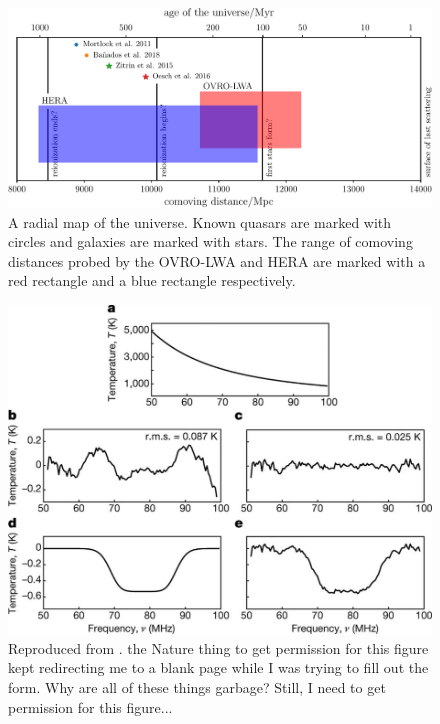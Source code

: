 \begin{bibunit}
\begin{figure}[t]
    \centering
    \includegraphics[width=\textwidth]{figures/chapter1/history-of-the-universe/history-of-the-universe}
    \caption{
        A radial map of the universe. Known quasars are marked with circles and galaxies are marked
        with stars. The range of comoving distances probed by the OVRO-LWA and HERA are marked with a red
        rectangle and a blue rectangle respectively.
    }
    \label{fig:history-of-the-universe}
\end{figure}

\begin{figure}[t]
    \centering
    \includegraphics[width=\textwidth]{figures/chapter1/bowman-2018-absorption-trough}
    \caption{
        Reproduced from \citet{2018Natur.555...67B}.
        the Nature thing to get permission for this figure kept redirecting me to a blank page while
        I was trying to fill out the form. Why are all of these things garbage? Still, I need to get
        permission for this figure...
    }
    \label{fig:bowman-absorption-trough}
\end{figure}


\end{bibunit}
